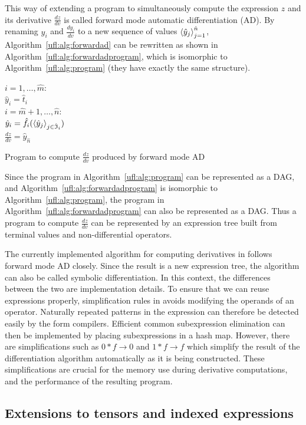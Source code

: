 This way of extending a program to simultaneously compute the
expression $z$ and its derivative $\frac{d z}{d v}$ is called forward
mode automatic differentiation (AD).  By renaming $y_i$ and $\frac{d
y_i}{d v}$ to a new sequence of values $\left\langle{\hat y_j}\right\rangle_{j=1}^{\hat
n}$, Algorithm~\ref{ufl:alg:forwardad} can be rewritten as shown in
Algorithm~\ref{ufl:alg:forwardadprogram}, which is isomorphic to
Algorithm~\ref{ufl:alg:program} (they have exactly the same
structure).
\begin{algorithm}
\afor $i = 1, \ldots, \hat m$:\\
\tab $\hat y_i = \hat t_i$ \\
\afor $i = \hat m + 1, \ldots, \hat n$:\\
\tab $\hat y_i = \hat f_i(\left\langle{\hat y_j}\right\rangle_{j\in\hat{\mathfrak{I}}_i})$ \\
$\frac{d z}{d v} = \hat y_{\hat n}$
\caption{Program to compute $\frac{d z}{d v}$ produced by forward mode AD}
\label{ufl:alg:forwardadprogram}
\end{algorithm}

Since the program in Algorithm~\ref{ufl:alg:program} can be
represented as a DAG, and Algorithm~\ref{ufl:alg:forwardadprogram} is
isomorphic to Algorithm~\ref{ufl:alg:program}, the program in
Algorithm~\ref{ufl:alg:forwardadprogram} can also be represented as a
DAG.  Thus a program to compute $\frac{d z}{d v}$ can be represented
by an expression tree built from terminal values and non-differential
operators.

The currently implemented algorithm for computing derivatives in
\ufl{} follows forward mode AD closely. Since the result is a new
expression tree, the algorithm can also be called symbolic
differentiation. In this context, the differences between the two are
implementation details.  To ensure that we can reuse expressions
properly, simplification rules in \ufl{} avoids modifying the operands
of an operator.  Naturally repeated patterns in the expression can
therefore be detected easily by the form compilers.  Efficient common
subexpression elimination can then be implemented by placing
subexpressions in a hash map.  However, there are simplifications such
as $0*f\rightarrow 0$ and $1*f\rightarrow f$ which simplify the result
of the differentiation algorithm automatically as it is being
constructed.  These simplifications are crucial for the memory use
during derivative computations, and the performance of the resulting
program.

\subsection{Extensions to tensors and indexed expressions}

